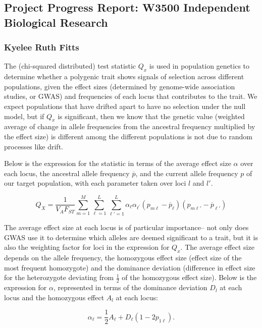 \documentclass[a4paper,10pt]{article}
\begin{document}
\subsection*{Project Progress Report: W3500 Independent Biological Research}
\subsubsection*{Kyelee Ruth Fitts}

The (chi-squared distributed) test statistic $Q_x$ is used in
population genetics to determine whether a polygenic trait shows
signals of selection across different populations, given the effect
sizes (determined by genome-wide association studies, or GWAS) and frequencies of each locus that
contributes to the trait. We expect populations that have drifted
apart to have no selection under the null model, but if $Q_x$ is
significant, then we know that the genetic value (weighted average of
change in allele frequencies from the ancestral frequency multiplied by the
effect size) is different among the different populations is not due to random processes like drift. 

Below is the expression for the statistic in terms of the average
effect size $\alpha$ over each locus, the ancestral allele frequency
$\overline{p}$, and the current allele frequency $p$ of our target
population, with each parameter taken over loci $l$ and $l'$. \cite{gwasintro}

\begin{equation} \label{eqn:Qxraw}
  Q_X = \frac{1}{V_A F_{ST}} \sum_{m=1}^M \sum_{\ell=1}^L \sum_{\ell\prime=1}^L \alpha_{\ell} \alpha_{\ell^{\prime}}\left(p_{m\ell} - \overline{p}_\ell \right)\left(p_{m \ell\prime} - \overline{p}_{\ell\prime}\right)
\end{equation}

The average effect size at each locus is of particular
importance-- not only does GWAS use it to determine which alleles are deemed
significant to a trait, but it is also the weighting factor for loci in the
expression for $Q_x$. The average effect size depends on the allele
frequency, the homozygous effect size (effect size of the most frequent homozygote) and the
dominance deviation (difference in effect size for the heterozygote
deviating from $\frac{1}{2}$ of the homozygous effect size). Below is the expression for $\alpha$,
represented in terms of the dominance deviation $D_l$ at each locus and
the homozygous effect $A_l$ at each locus:

\begin{equation}  \label{eqn:avgeff}
  \alpha_\ell = \frac{1}{2} A_\ell + D_\ell\left(1-2p_{1\ell}\right).
\end{equation}
\end{document}
